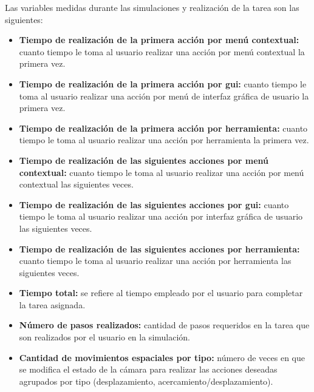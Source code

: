 Las variables medidas durante las simulaciones y realización de la tarea son las
siguientes:


\begin{itemize}

\item \textbf{Tiempo de realización de la primera acción por menú contextual:} 
    cuanto tiempo le toma al usuario realizar una acción por menú contextual la 
    primera vez.

\item \textbf{Tiempo de realización de la primera acción por \Gls{gui}:} cuanto 
    tiempo le toma al usuario realizar una acción por menú de 
    interfaz gráfica de usuario la primera vez.
    
\item \textbf{Tiempo de realización de la primera acción por herramienta:} cuanto 
    tiempo le toma al usuario realizar una acción por herramienta la primera vez.
    
\item \textbf{Tiempo de realización de las siguientes acciones por menú contextual:} 
    cuanto tiempo le toma al usuario realizar una acción por menú 
    contextual las siguientes veces.

\item \textbf{Tiempo de realización de las siguientes acciones por \Gls{gui}:} 
    cuanto tiempo le toma al usuario realizar una acción 
    por interfaz gráfica de usuario las siguientes veces.

\item \textbf{Tiempo de realización de las siguientes acciones por herramienta:} 
    cuanto tiempo le toma al usuario realizar una acción por herramienta 
    las siguientes veces.

\item \textbf{Tiempo total:} se refiere al tiempo empleado por el usuario para 
    completar la tarea asignada.

\item \textbf{Número de pasos realizados:} cantidad de pasos requeridos en la tarea 
    que son realizados por el usuario en la simulación. 

\item \textbf{Cantidad de movimientos espaciales por tipo:} número de veces en que se 
    modifica el estado de la cámara para realizar las acciones deseadas agrupados por 
    tipo (desplazamiento, acercamiento/desplazamiento).


\end{itemize}

